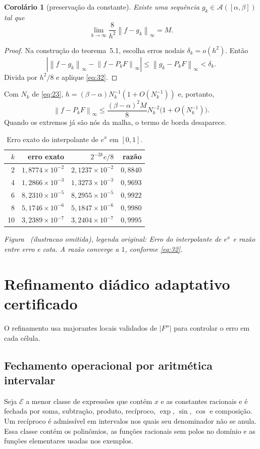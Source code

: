 \documentclass[11pt,a4paper]{article}
\theoremstyle{preciso}
\newtheorem{corolario}[teorema]{Corolário}
\theoremstyle{definition}
\newcommand{\Asm}{\mathcal A}
\newcommand{\EE}{\mathcal E}
\newcommand{\norm}[1]{\left\|#1\right\|_{\infty}}
\newcommand{\eqn}[2]{\begin{equation}\label{eq:#1}#2\end{equation}}
\newcommand{\figura}[4]{\par\refstepcounter{figure}\label{fig:#4}\noindent\textit{Figura \thefigure~(ilustracao omitida), legenda original: #3}\par}
\begin{document}
\begin{corolario}[preservação da constante]
Existe uma sequência $g_k\in\Asm([\alpha,\beta])$ tal que
\[
\lim_{k\to\infty}\frac8{h^2}\norm{f-g_k}=M.
\]
\end{corolario}
\begin{proof}
Na construção do teorema~5.1, escolha erros nodais $\delta_k=o(h^2)$. Então
\[
\left|\norm{f-g_k}-\norm{f-P_kF}\right|\le\norm{g_k-P_kF}<\delta_k.
\]
Divida por $h^2/8$ e aplique \eqref{eq:32}.
\end{proof}
Com $N_k$ de \eqref{eq:23}, $h=(\beta-\alpha)N_k^{-1}(1+O(N_k^{-1}))$ e, portanto,
\eqn{35}{\norm{f-P_kF}\le\frac{(\beta-\alpha)^2M}8N_k^{-2}\bigl(1+O(N_k^{-1})\bigr).}
Quando os extremos já são nós da malha, o termo de borda desaparece.
\begin{table}[!htbp]\centering
\caption{Erro exato do interpolante de $e^x$ em $[0,1]$.}
\begin{tabular}{rrrr}\toprule
$k$&erro exato&$2^{-2k}e/8$&razão\\\midrule
2&$1{,}8774\times10^{-2}$&$2{,}1237\times10^{-2}$&$0{,}8840$\\
4&$1{,}2866\times10^{-3}$&$1{,}3273\times10^{-3}$&$0{,}9693$\\
6&$8{,}2310\times10^{-5}$&$8{,}2955\times10^{-5}$&$0{,}9922$\\
8&$5{,}1746\times10^{-6}$&$5{,}1847\times10^{-6}$&$0{,}9980$\\
10&$3{,}2389\times10^{-7}$&$3{,}2404\times10^{-7}$&$0{,}9995$\\\bottomrule
\end{tabular}
\end{table}
\figura{05_taxa_exponencial}{.98}{Erro do interpolante de $e^x$ e razão entre erro e cota. A razão converge a $1$, conforme \eqref{eq:32}.}{taxa}


\section{Refinamento diádico adaptativo certificado}
O refinamento usa majorantes locais validados de $|F''|$ para controlar o erro em cada célula.

\subsection{Fechamento operacional por aritmética intervalar}
Seja $\EE$ a menor classe de expressões que contém $x$ e as constantes racionais e é fechada por soma, subtração, produto, recíproco, $\exp$, $\sin$, $\cos$ e composição. Um recíproco é admissível em intervalos nos quais seu denominador não se anula. Essa classe contém os polinômios, as funções racionais sem polos no domínio e as funções elementares usadas nos exemplos.
\end{document}
